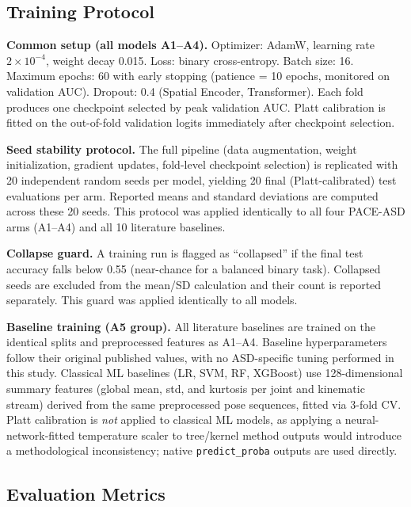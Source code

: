 \documentclass[a4paper,fleqn]{cas-sc}
\begin{document}
\subsection{Training Protocol}
\label{sec:exp_training}

\textbf{Common setup (all models A1--A4).}
Optimizer: AdamW, learning rate $2 \times 10^{-4}$, weight decay 0.015.
Loss: binary cross-entropy.
Batch size: 16. Maximum epochs: 60 with early stopping (patience = 10 epochs,
monitored on validation AUC).
Dropout: 0.4 (Spatial Encoder, Transformer).
Each fold produces one checkpoint selected by peak validation AUC.
Platt calibration is fitted on the out-of-fold validation logits immediately
after checkpoint selection.

\textbf{Seed stability protocol.}
The full pipeline (data augmentation, weight initialization, gradient updates,
fold-level checkpoint selection) is replicated with 20 independent random seeds
per model, yielding 20 final (Platt-calibrated) test evaluations per arm.
Reported means and standard deviations are computed across these 20 seeds.
This protocol was applied identically to all four PACE-ASD arms (A1--A4) and
all 10 literature baselines.

\textbf{Collapse guard.}
A training run is flagged as ``collapsed'' if the final test accuracy falls
below 0.55 (near-chance for a balanced binary task).
Collapsed seeds are excluded from the mean/SD calculation and their count
is reported separately.
This guard was applied identically to all models.

\textbf{Baseline training (A5 group).}
All literature baselines are trained on the identical splits and preprocessed
features as A1--A4.
Baseline hyperparameters follow their original published values, with no
ASD-specific tuning performed in this study.
Classical ML baselines (LR, SVM, RF, XGBoost) use 128-dimensional summary
features (global mean, std, and kurtosis per joint and kinematic stream)
derived from the same preprocessed pose sequences, fitted via 3-fold CV.
Platt calibration is \textit{not} applied to classical ML models, as applying
a neural-network-fitted temperature scaler to tree/kernel method outputs would
introduce a methodological inconsistency; native \texttt{predict\_proba}
outputs are used directly.

\subsection{Evaluation Metrics}
\label{sec:exp_metrics}
\end{document}
